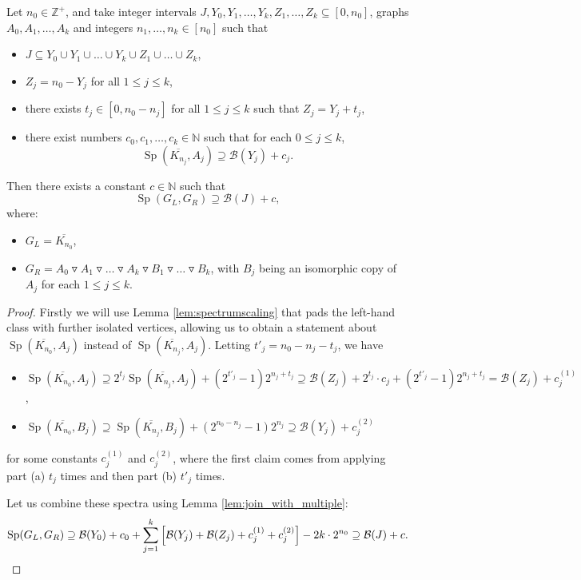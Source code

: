 \documentclass[10pt,a4paper]{article}
\numberwithin{equation}{section}
\newcommand{\nn}{\mathbb{N}}
\newcommand{\zz}{\mathbb{Z}}
\newcommand{\cB}{\mathcal{B}}
\DeclareMathOperator{\Sp}{Sp}
\begin{document}
\begin{proposition}\label{prop:combined_skeleton}
Let $n_0\in \zz^{+}$, and take integer intervals $J,Y_0,Y_1,\ldots,Y_k,Z_1,\ldots,Z_k\subseteq [0, n_0]$,  graphs $A_0,A_1,\ldots,A_k$ and integers $n_1, \ldots, n_k\in [n_0]$ such that
\begin{itemize}
\itemsep0em
\item $J\subseteq Y_0\cup Y_1\cup \ldots\cup Y_k\cup Z_1\cup \ldots\cup Z_k$,
\item $Z_j=n_0-Y_j$ for all $1\le j\le k$,
\item there exists $t_j\in [0, n_0-n_j]$ for all $1\le j\le k$ such that $Z_j=Y_j+t_j$,
\item there exist numbers $c_0, c_1, \ldots, c_{k}\in \nn$ such that for each $0\le j\le k$, $$\Sp(\overline{K_{n_j}}, A_j)\supseteq \cB(Y_j)+c_j.$$
\end{itemize}

Then there exists a constant $c\in \nn$ such that $$\Sp(G_L, G_R)\supseteq \cB(J)+c,$$ where:
\begin{itemize}
\itemsep0em
\item $G_L=\overline{K_{n_0}}$,
\item $G_R=A_0\triangledown A_1\triangledown \ldots\triangledown A_k\triangledown B_1\triangledown \ldots\triangledown B_k$, with $B_j$ being an isomorphic copy of $A_j$ for each $1\le j\le k$.
\end{itemize}
\end{proposition}
\begin{proof}
 Firstly we will use Lemma \ref{lem:spectrumscaling} that pads the left-hand class with further isolated vertices, allowing us to obtain a statement about $\Sp(\overline{K_{n_0}}, A_j)$ instead of $\Sp(\overline{K_{n_j}}, A_j)$. Letting $t'_j=n_0-n_j-t_j$, we have
 \begin{itemize}
 \itemsep0em
 \item $\Sp(\overline{K_{n_0}}, A_j)\supseteq 2^{t_j} \Sp(\overline{K_{n_j}}, A_j) + (2^{t'_j}-1)2^{n_j+t_j}\supseteq \cB(Z_j)+2^{t_j}\cdot c_j+(2^{t'_j}-1) 2^{n_j+t_j}=\cB(Z_j)+c^{(1)}_j$,
 \item $\Sp(\overline{K_{n_0}}, B_j)\supseteq \Sp(\overline{K_{n_j}}, B_j) + (2^{n_0-n_j}-1)2^{n_j}\supseteq \cB(Y_j)+c^{(2)}_j$
 \end{itemize}

 for some constants $c^{(1)}_j$ and $c^{(2)}_j$, where the first claim comes from applying part (a) $t_j$ times and then part (b) $t'_j$ times.

 Let us combine these spectra using Lemma \ref{lem:join_with_multiple}:
 \begin{equation*}
 \Sp(G_L, G_R)\supseteq \cB(Y_0) + c_0 + \sum_{j=1}^k \left[\cB(Y_j) + \cB(Z_j) + c_j^{(1)} + c_j^{(2)} \right] - 2k\cdot 2^{n_0}\supseteq \cB(J)+c. \qedhere
 \end{equation*}
\end{proof}
\end{document}

